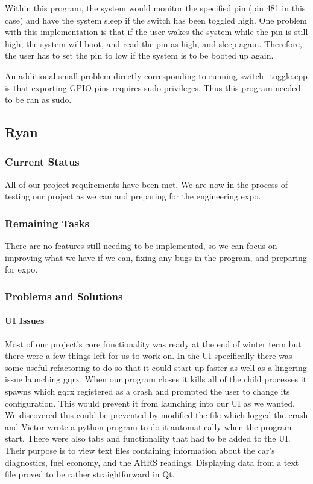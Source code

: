 \documentclass[onecolumn, draftclsnofoot, 10pt, compsoc]{IEEEtran}
\begin{document}
Within this program, the system would monitor the specified pin (pin 481 in this case) and have the system sleep if the switch has been toggled high. One problem with this implementation is that if the user wakes the system while the pin is still high, the system will boot, and read the pin as high, and sleep again. Therefore, the user has to set the pin to low if the system is to be booted up again. \par
An additional small problem directly corresponding to running switch\_toggle.cpp is that exporting GPIO pins requires sudo privileges. Thus this program needed to be ran as sudo. \par

\newpage

\subsection{Ryan}
\subsubsection{Current Status}
All of our project requirements have been met. We are now in the process of testing our project as we can and preparing for the engineering expo.

\subsubsection{Remaining Tasks}
There are no features still needing to be implemented, so we can focus on improving what we have if we can, fixing any bugs in the program, and preparing for expo.

\subsubsection{Problems and Solutions}
\paragraph{\textbf{UI Issues}}
Most of our project's core functionality was ready at the end of winter term but there were a few things left for us to work on. In the UI specifically there was some useful refactoring to do so that it could start up faster as well as a lingering issue launching gqrx. When our program closes it kills all of the child processes it spawns which gqrx registered as a crash and prompted the user to change its configuration. This would prevent it from launching into our UI as we wanted. We discovered this could be prevented by modified the file which logged the crash and Victor wrote a python program to do it automatically when the program start. There were also tabs and functionality that had to be added to the UI. Their purpose is to view text files containing information about the car's diagnostics, fuel economy, and the AHRS readings. Displaying data from a text file proved to be rather straightforward in Qt.\par
\end{document}
